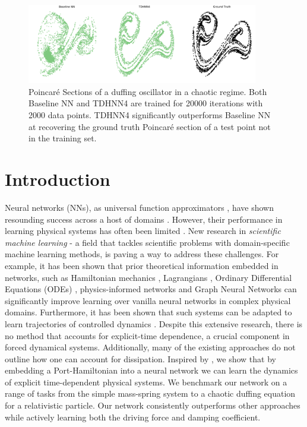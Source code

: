 \documentclass[twoside]{article}
\begin{document}
\begin{figure}[ht!]
\centering
\includegraphics[width=0.9\textwidth]{figures/main_fig.pdf}
\caption{Poincar\'e Sections of a duffing oscillator in a chaotic regime. Both Baseline NN and TDHNN4 are trained for 20000 iterations with 2000 data points. TDHNN4 significantly outperforms Baseline NN at recovering the ground truth Poincar\'e section of a test point not in the training set.}
\label{fig.chaos1}
\end{figure}

\section{Introduction}

Neural networks (NNs), as universal function approximators \cite{hornik_multilayer_1989}, have shown resounding success across a host of domains \cite{he_mask_2018,devlin_bert_2019,toussaint_differentiable_2018,yao_tensormol-01_2018}. However, their performance in learning physical systems has often been limited \cite{greydanus_hamiltonian_2019,pukrittayakamee_simultaneous_2009}. New research in \textit{scientific machine learning} - a field that tackles scientific problems with domain-specific machine learning methods, is paving a way to address these challenges. For example, it has been shown that prior theoretical information embedded in networks, such as Hamiltonian mechanics \cite{mattheakis_hamiltonian_2020, greydanus_hamiltonian_2019}, Lagrangians \cite{cranmer_lagrangian_2020, lutter_deep_2019}, Ordinary Differential Equations (ODEs) \cite{chen_neural_2018}, physics-informed networks \cite{raissi_physics_2017} and Graph Neural Networks \cite{battaglia_interaction_2016,sanchez-gonzalez_hamiltonian_2019} can significantly improve learning over vanilla neural networks in complex physical domains. Furthermore, it has been shown that such systems can be adapted to learn trajectories of controlled dynamics \cite{lutter_deep_2019,zhong_dissipative_2020}. Despite this extensive research, there is no method that accounts for explicit-time dependence, a crucial component in forced dynamical systems. Additionally, many of the existing approaches do not outline how one can account for dissipation. Inspired by \cite{zhong_dissipative_2020}, we show that by embedding a Port-Hamiltonian into a neural network we can learn the dynamics of explicit time-dependent physical systems. We benchmark our network on a range of tasks from the simple mass-spring system to a chaotic duffing equation for a relativistic particle. Our network consistently outperforms other approaches while actively learning both the driving force and damping coefficient. 
\end{document}
